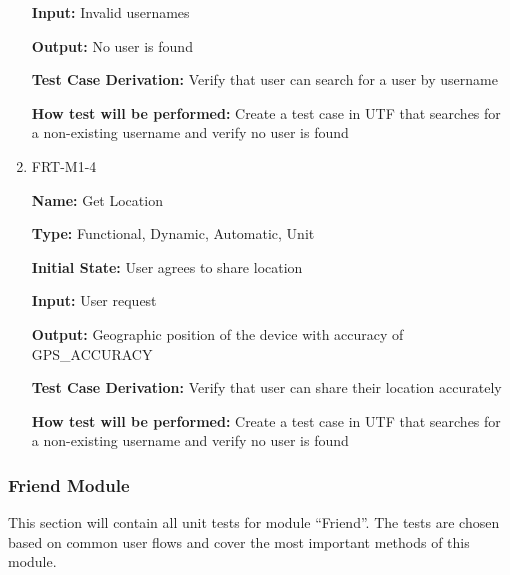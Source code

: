 \documentclass[12pt, titlepage]{article}
\begin{document}
\begin{enumerate}
\textbf{Input:} Invalid usernames
					
\textbf{Output:} No user is found

\textbf{Test Case Derivation:} Verify that user can search for a user by username

\textbf{How test will be performed:} Create a test case in UTF that searches for a non-existing username and verify no user is found

\item{FRT-M1-4}

\textbf{Name:} Get Location

\textbf{Type:} Functional, Dynamic, Automatic, Unit
					
\textbf{Initial State:} User agrees to share location
					
\textbf{Input:} User request
					
\textbf{Output:} Geographic position of the device with accuracy of GPS\_ACCURACY

\textbf{Test Case Derivation:} Verify that user can share their location accurately

\textbf{How test will be performed:} Create a test case in UTF that searches for a non-existing username and verify no user is found
\end{enumerate}

\subsubsection{Friend Module}

This section will contain all unit tests for module ``Friend''. The tests are chosen based on common user flows and cover the most important methods of this module.
\end{document}
